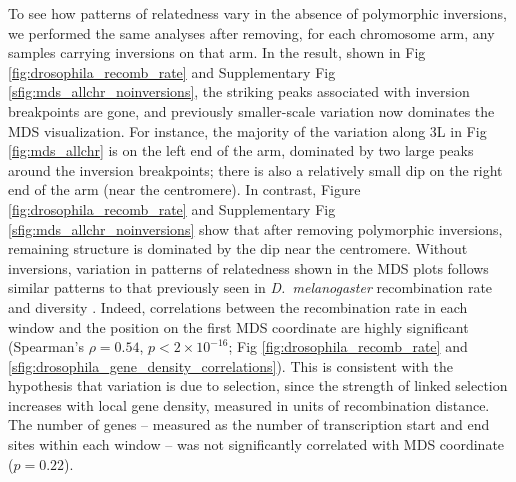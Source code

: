 \documentclass[11pt, oneside]{article}   	%
\newcommand\citep{\cite}
\newcommand{\Figure}{Fig }
\newcommand{\Figures}{Fig }
\newcommand{\Figure}{{Figure }}
\newcommand{\Figures}{{Figures }}
\begin{document}
To see how patterns of relatedness vary in the absence of polymorphic inversions,
we performed the same analyses after removing, for each chromosome arm,
any samples carrying inversions on that arm.
In the result, shown in \Figure \ref{fig:drosophila_recomb_rate} and
Supplementary \Figure \ref{sfig:mds_allchr_noinversions},
the striking peaks associated with inversion breakpoints are gone,
and previously smaller-scale variation now dominates the MDS visualization.
For instance, the majority of the variation along 3L in \Figure \ref{fig:mds_allchr}
is on the left end of the arm, dominated by two large peaks around the inversion breakpoints;
there is also a relatively small dip on the right end of the arm (near the centromere).
In contrast, Figure \ref{fig:drosophila_recomb_rate} 
and Supplementary \Figure \ref{sfig:mds_allchr_noinversions} 
show that after removing polymorphic inversions,
remaining structure is dominated by the dip near the centromere.
Without inversions, variation in patterns of relatedness shown in the MDS plots
follows similar patterns to that previously seen in \textit{D.~melanogaster} recombination rate and diversity \citep{langley2012genomic,mackay2012drosophila}.
Indeed, correlations between the recombination rate in each window and the position on the first MDS coordinate are highly significant
(Spearman's $\rho=0.54$, $p<2 \times 10^{-16}$; \Figures \ref{fig:drosophila_recomb_rate} and \ref{sfig:drosophila_gene_density_correlations}).
This is consistent with the hypothesis that variation
is due to selection, since the strength of linked selection increases with local gene density, 
measured in units of recombination distance.
The number of genes -- measured as the number of transcription start and end sites within each window --
was not significantly correlated with MDS coordinate ($p=0.22$).
\end{document}
